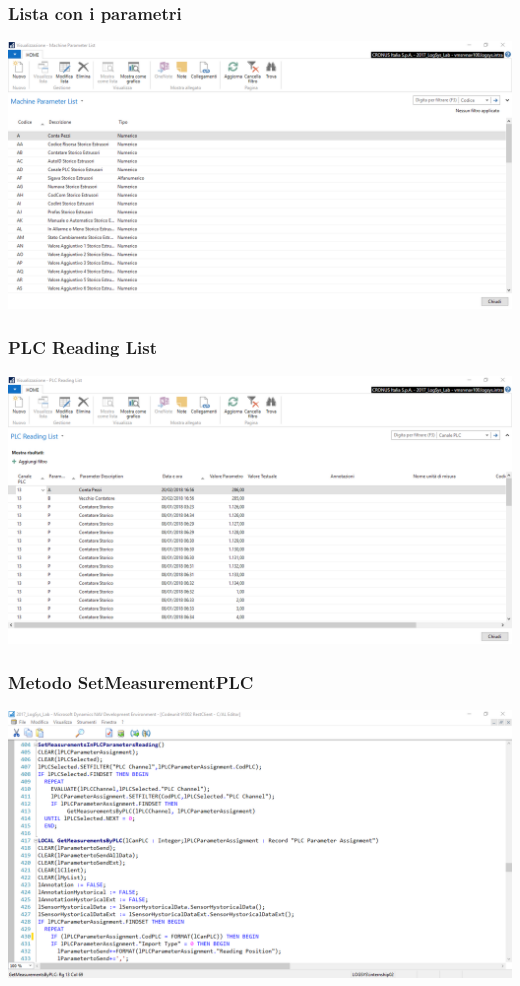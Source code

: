 \documentclass{beamer}
\begin{document}
\begin{frame}
\frametitle{Lista con i parametri}
\includegraphics[width=1\textwidth]{images/MachineParameter.png}
\end{frame}


\begin{frame}
\frametitle{PLC Reading List}
\includegraphics[width=1\textwidth]{images/PLCReadingList.png}
\end{frame}


\begin{frame}
\frametitle{Metodo SetMeasurementPLC}
\includegraphics[width=1\textwidth]{images/NAVSetMesurament.png}
\end{frame}
\end{document}
